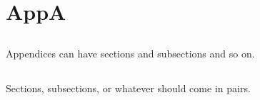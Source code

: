 \chapter{AppA\label{app:a}}

\section{}

Appendices can have sections  and subsections and so on.

\section{}

Sections, subsections, or whatever should come in pairs.
